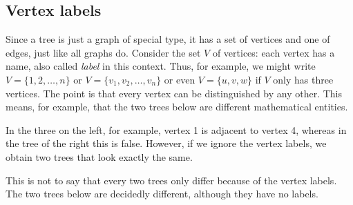\documentclass[a4paper]{book}
\theoremstyle{changebreak}                %
\begin{document}
\subsection{Vertex labels}
Since a tree is just a graph of special type, it has a set of vertices
and one of edges, just like all graphs do. Consider the set $V$ of
vertices: each vertex has a name, also called {\it
  label} in this context. Thus, for
example, we might write $V=\{1,2,\ldots,n\}$ or
$V=\{v_1,v_2,\ldots,v_n\}$ or even $V=\{u,v,w\}$ if $V$ only has three
vertices. The point is that every vertex can be distinguished by any
other. This means, for example, that the two trees below are different
mathematical entities.
\begin{center}
\hspace*{1cm}
\end{center}
In the three on the left, for example, vertex 1 is adjacent to
vertex 4, whereas in the tree of the right this is false.
However, if we ignore the vertex labels, we obtain two trees
that look exactly the same.
\begin{center}
\hspace*{1cm}
\end{center}
This is not to say that every two trees only differ because of the
vertex labels. The two trees below are decidedly different, although
they have no labels.
\begin{center}
\hspace*{1cm}
\end{center}
\end{document}
